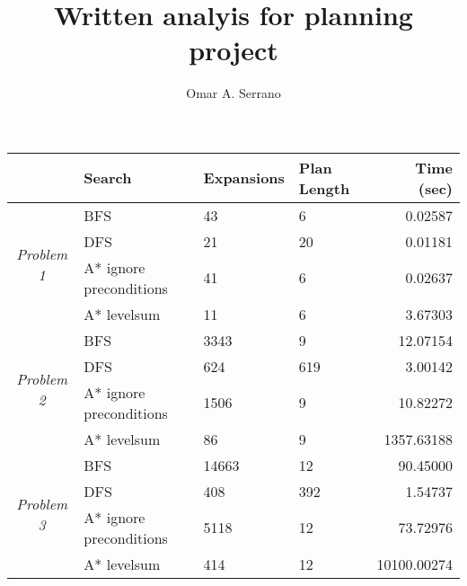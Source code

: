 \documentclass[10pt,a4paper]{article}
\title{Written analyis for planning project}
\author{Omar A. Serrano}
\begin{document}
\maketitle

\begin{tabular}{|c|l|l|l|r|}
    \hline
    & \textbf{Search} & \textbf{Expansions}
    & \textbf{Plan Length} & \textbf{Time (sec)} \\
    \hline
    \multirow{4}{*}{\textit{Problem 1}} & BFS & 43 & 6 & 0.02587 \\
    \cline{2-5}
    & DFS & 21 & 20 & 0.01181 \\
    \cline{2-5}
    & A* ignore preconditions & 41 & 6 & 0.02637 \\
    \cline{2-5}
    & A* levelsum & 11 & 6 & 3.67303 \\
    \hline
    \multirow{4}{*}{\textit{Problem 2}} & BFS & 3343 & 9 & 12.07154 \\
    \cline{2-5}
    & DFS & 624 & 619 & 3.00142 \\
    \cline{2-5}
    & A* ignore preconditions & 1506 & 9 & 10.82272 \\
    \cline{2-5}
    & A* levelsum & 86 & 9 & 1357.63188 \\
    \hline
    \multirow{4}{*}{\textit{Problem 3}} & BFS & 14663 & 12 & 90.45000 \\
    \cline{2-5}
    & DFS & 408 & 392 & 1.54737 \\
    \cline{2-5}
    & A* ignore preconditions & 5118 & 12 & 73.72976 \\
    \cline{2-5}
    & A* levelsum & 414 & 12 & 10100.00274 \\
    \hline
\end{tabular}
\end{document}

